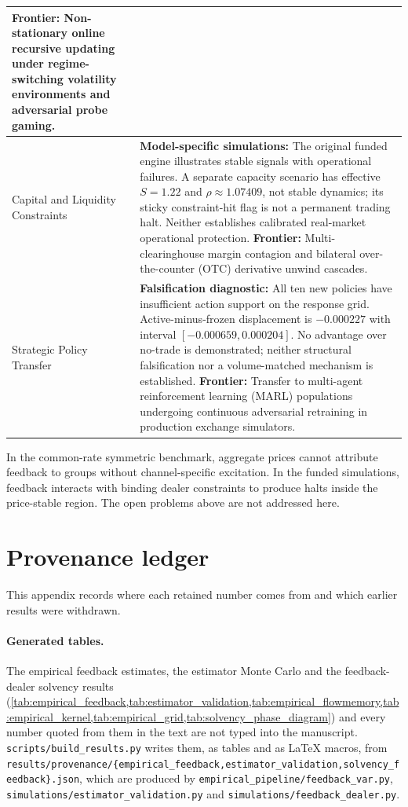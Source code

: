 \documentclass[10pt,twocolumn,letterpaper]{article}
\theoremstyle{definition}
\theoremstyle{remark}
\begin{document}
\begin{table}[htbp]
\begin{tabularx}{\textwidth}{>{\raggedright\arraybackslash}p{}X}
\textbf{Frontier:} Non-stationary online recursive updating under regime-switching volatility environments and adversarial probe gaming. \\
\midrule
Capital and Liquidity Constraints & \textbf{Model-specific simulations:} The original funded engine illustrates stable signals with operational failures. A separate capacity scenario has effective $S=1.22$ and $\rho\approx1.07409$, not stable dynamics; its sticky constraint-hit flag is not a permanent trading halt. Neither establishes calibrated real-market operational protection.\newline
\textbf{Frontier:} Multi-clearinghouse margin contagion and bilateral over-the-counter (OTC) derivative unwind cascades. \\
\midrule
Strategic Policy Transfer & \textbf{Falsification diagnostic:} All ten new policies have insufficient action support on the response grid. Active-minus-frozen displacement is $-0.000227$ with interval $[-0.000659,0.000204]$. No advantage over no-trade is demonstrated; neither structural falsification nor a volume-matched mechanism is established.\newline
\textbf{Frontier:} Transfer to multi-agent reinforcement learning (MARL) populations undergoing continuous adversarial retraining in production exchange simulators. \\
\bottomrule
\end{tabularx}
\end{table}

In the common-rate symmetric benchmark, aggregate prices cannot attribute feedback to groups without channel-specific excitation. In the funded simulations, feedback interacts with binding dealer constraints to produce halts inside the price-stable region. The open problems above are not addressed here.


\clearpage
\onecolumn
\section{Provenance ledger}
\label{app:provenance}
This appendix records where each retained number comes from and which earlier results were withdrawn.

\paragraph{Generated tables.} The empirical feedback estimates, the estimator Monte Carlo and the feedback-dealer solvency results (\cref{tab:empirical_feedback,tab:estimator_validation,tab:empirical_flowmemory,tab:empirical_kernel,tab:empirical_grid,tab:solvency_phase_diagram}) and every number quoted from them in the text are not typed into the manuscript. \texttt{scripts/build\_results.py} writes them, as tables and as \LaTeX{} macros, from \texttt{results/provenance/\{empirical\_feedback,estimator\_validation,solvency\_feedback\}.json}, which are produced by \texttt{empirical\_pipeline/feedback\_var.py}, \texttt{simulations/estimator\_validation.py} and \texttt{simulations/feedback\_dealer.py}.
\end{document}
